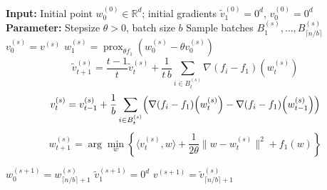 \documentclass{article}
\DeclareMathOperator{\prox}{prox}
\begin{document}
\begin{algorithm}[t]
\caption{\texttt{NFG-SS}}
\label{alg:nofullgrad_sarah}
\begin{algorithmic}[1]
\State \textbf{Input:} Initial point $w_0^{(0)} \in \mathbb{R}^d$; initial gradients
$\tilde v_1^{(0)} = 0^d$, $v_0^{(0)} = 0^d$
\State \textbf{Parameter:} Stepsize $\theta > 0$, batch size $b$
    \State Sample batches $B_1^{(s)}, \dots, B_{\lceil n/b \rceil}^{(s)}$ \label{line:sample_batches}
    \State $v_0^{(s)} = v^{(s)}$ 
    \State $w_1^{(s)} = \prox_{\theta f_1}\!\left(w_0^{(s)} - \theta v_0^{(s)}\right)$
        \State \label{line:calculating_v_tilde}
        \[
        \tilde v_{t+1}^{(s)}
        =
        \frac{t-1}{t}\tilde v_t^{(s)}
        +
        \frac{1}{t\, b}\sum_{i \in B_t^{(s)}} \nabla (f_i - f_1)\!\left(w_t^{(s)}\right)
        \]
        \State 
        \[
        v_t^{(s)}
        =
        v_{t-1}^{(s)}
        +
        \frac{1}{b}\sum_{i \in B_t^{(s)}}
        \Bigl(
        \nabla (f_i - f_1)\!\left(w_t^{(s)}\right)
        -
        \nabla (f_i - f_1)\!\left(w_{t-1}^{(s)}\right)
        \Bigr)
        \] \label{line:calculating_new_v}
        \State
        \[
        w_{t+1}^{(s)}
        =
        \arg\min_{w}
        \left\{
        \langle v_t^{(s)}, w \rangle
        +
        \frac{1}{2\theta}\|w - w_t^{(s)}\|^2
        +
        f_1(w)
        \right\}
        \] \label{line:argmin-step}
        
    \EndFor
    \State $w_0^{(s+1)} = w_{\lceil n/b \rceil + 1}^{(s)}$
    \State $\tilde v_1^{(s+1)} = 0^d$ \label{line:reinitialization_of_v}
    \State $v^{(s+1)} = \tilde v_{\lceil n/b \rceil + 1}^{(s)}$
\EndFor
\end{algorithmic}
\end{algorithm}


\end{document}

